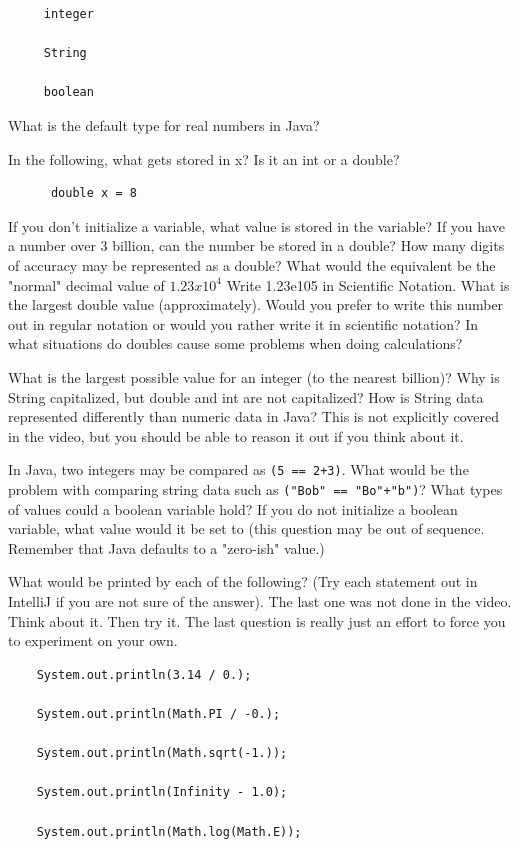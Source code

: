\documentclass[letterpaper,11pt]{exam}
\begin{document}
\begin{questions}
\begin{samepage}
\begin{verbatim}
     integer

     String

     boolean
\end{verbatim}
\end{samepage}
\question What is the default type for real numbers in Java?
\begin{samepage}
\question In the following, what gets stored in x?  Is it an int or a double?
\begin{verbatim}
      double x = 8
\end{verbatim}
\end{samepage}
\question If you don't initialize a variable, what value is stored in the variable?
\question If you have a number over 3 billion, can the number be stored in a double?
\question How many digits of accuracy may be represented as a double?
\question What would the equivalent be the "normal" decimal value of $1.23 x 10^4$
\question Write 1.23e105 in Scientific Notation.
\question What is the largest double value (approximately).  Would you prefer to write this number out in regular notation or would you rather write it in scientific notation?
\question In what situations do doubles cause some problems when doing calculations?

\question What is the largest possible value for an integer (to the nearest billion)?
\question Why is String capitalized, but double and int are not capitalized?
\question How is String data represented differently than numeric data in Java?
\vspace{1cm}
\question This is not explicitly covered in the video, but you should be able to reason it out if you think about it.  

In Java, two integers may be compared as \texttt{(5 == 2+3)}.  What would be the problem with comparing string data such as \texttt{("Bob" == "Bo"+"b")}?
\vspace{1cm}
\question What types of values could a boolean variable hold?
\question If you do not initialize a boolean variable, what value would it be set to (this question may be out of sequence.  Remember that Java defaults to a "zero-ish" value.)
\begin{samepage}
\question What would be printed by each of the following?  (Try each statement out in IntelliJ if you are not sure of the answer).  The last one was not done in the video.  Think about it.  Then try it.  The last question is really just an effort to force you to experiment on your own.
\begin{verbatim}
    System.out.println(3.14 / 0.);

    System.out.println(Math.PI / -0.);
    
    System.out.println(Math.sqrt(-1.));
    
    System.out.println(Infinity - 1.0);

    System.out.println(Math.log(Math.E)); 
\end{verbatim}
\end{samepage}

\end{questions}
\end{document}
